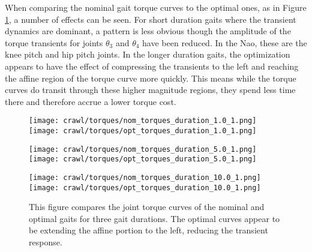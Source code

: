 When comparing the nominal gait torque curves to the optimal ones, as in Figure
\ref{fig:vrep_comparison_joint_torques_by_duration1}, a number of effects can be seen.
For short duration gaits where the transient dynamics are dominant, a pattern is less
obvious though the amplitude of the torque transients for joints $\theta_3$ and $\theta_4$
have been reduced. In the Nao, these are the knee pitch and hip pitch joints.
In the longer duration gaits, the optimization appears to have the effect of compressing
the transients to the left and reaching the affine region of the torque curve more quickly.
This means while the torque curves do transit through these higher magnitude regions,
they spend less time there and therefore accrue a lower torque cost.

\begin{figure}
  \centerline{
    \texttt{[image: crawl/torques/nom\_torques\_duration\_1.0\_1.png]}
    \texttt{[image: crawl/torques/opt\_torques\_duration\_1.0\_1.png]}
  }
  \centerline{
    \texttt{[image: crawl/torques/nom\_torques\_duration\_5.0\_1.png]}
    \texttt{[image: crawl/torques/opt\_torques\_duration\_5.0\_1.png]}
  }
  \centerline{
    \texttt{[image: crawl/torques/nom\_torques\_duration\_10.0\_1.png]}
    \texttt{[image: crawl/torques/opt\_torques\_duration\_10.0\_1.png]}
  }
  \caption{This figure compares the joint torque curves of the nominal and optimal
           gaits for three gait durations. The optimal curves appear to be extending
           the affine portion to the left, reducing the transient response.}
  \label{fig:vrep_comparison_joint_torques_by_duration1}
\end{figure}


